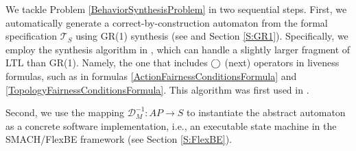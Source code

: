 
We tackle Problem \ref{BehaviorSynthesisProblem} in two sequential steps.
First, we automatically generate a correct-by-construction automaton from the formal specification $\mathcal{T}_S$ using GR(1) synthesis (see \cite{piterman_06} and Section \ref{S:GR1}).
Specifically, we employ the synthesis algorithm in \cite{SLUGS}, which can handle a slightly larger fragment of LTL than GR(1).
Namely, the one that includes $\operatorname{\bigcirc}$ (next) operators in liveness formulas, such as in formulas \eqref{ActionFairnessConditionsFormula} and \eqref{TopologyFairnessConditionsFormula}.
This algorithm was first used in \cite{Vasu2013ICRA}.

Second, we use the mapping $\mathcal{D}_M^{-1}: AP \rightarrow S$ to instantiate the abstract automaton as a concrete software implementation, i.e., an executable state machine in the SMACH/FlexBE framework (see Section \ref{S:FlexBE}).


